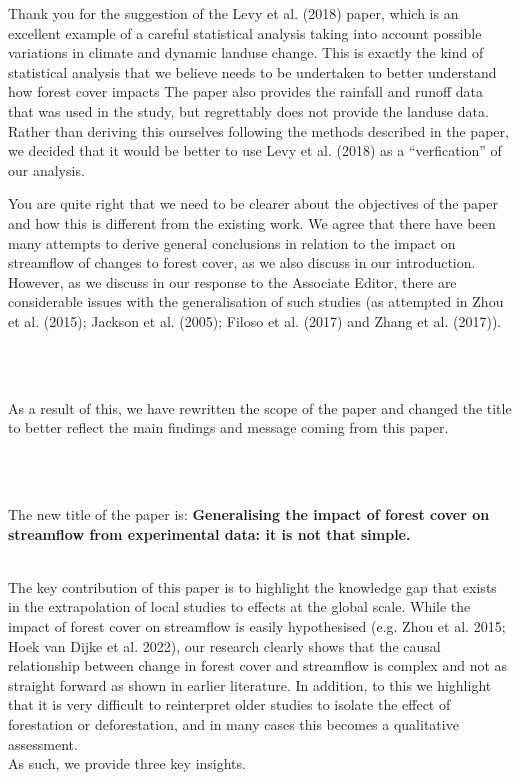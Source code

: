 \documentclass[]{elsarticle} %
\begin{document}
Thank you for the suggestion of the Levy et al. (2018) paper, which is an excellent example of a careful statistical analysis taking into account possible variations in climate and dynamic landuse change. This is exactly the kind of statistical analysis that we believe needs to be undertaken to better understand how forest cover impacts The paper also provides the rainfall and runoff data that was used in the study, but regrettably does not provide the landuse data. Rather than deriving this ourselves following the methods described in the paper, we decided that it would be better to use Levy et al. (2018) as a ``verfication'' of our analysis.

You are quite right that we need to be clearer about the objectives of the paper and how this is different from the existing work. We agree that there have been many attempts to derive general conclusions in relation to the impact on streamflow of changes to forest cover, as we also discuss in our introduction. However, as we discuss in our response to the Associate Editor, there are considerable issues with the generalisation of such studies (as attempted in Zhou et al. (2015); Jackson et al. (2005); Filoso et al. (2017) and Zhang et al. (2017)).\\
\strut \\
\strut \\
As a result of this, we have rewritten the scope of the paper and changed the title to better reflect the main findings and message coming from this paper.\\
\strut \\
\strut \\
The new title of the paper is:
\textbf{Generalising the impact of forest cover on streamflow from experimental data: it is not that simple.}\\
\strut \\
The key contribution of this paper is to highlight the knowledge gap that exists in the extrapolation of local studies to effects at the global scale. While the impact of forest cover on streamflow is easily hypothesised (e.g. Zhou et al. 2015; Hoek van Dijke et al. 2022), our research clearly shows that the causal relationship between change in forest cover and streamflow is complex and not as straight forward as shown in earlier literature. In addition, to this we highlight that it is very difficult to reinterpret older studies to isolate the effect of forestation or deforestation, and in many cases this becomes a qualitative assessment.\\
As such, we provide three key insights.
\end{document}
